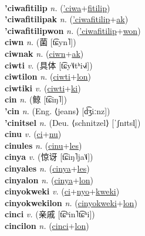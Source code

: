  \label{'ciwa} \\
\textbf{'ciwafitilip} \textit{n.} (\hyperref['ciwa]{'ciwa}+\hyperref[fitilip]{fitilip})
 \label{'ciwafitilip} \\
\textbf{'ciwafitilipak} \textit{n.} (\hyperref['ciwafitilip]{'ciwafitilip}+\hyperref[ak]{ak})
 \label{'ciwafitilipak} \\
\textbf{'ciwafitilipwon} \textit{n.} (\hyperref['ciwafitilip]{'ciwafitilip}+\hyperref[won]{won})
 \label{'ciwafitilipwon} \\
\textbf{ciwn} \textit{n.} ({\chinese{}菌} [t͡ɕyn˥])
 \label{ciwn} \\
\textbf{ciwnak} \textit{n.} (\hyperref[ciwn]{ciwn}+\hyperref[ak]{ak})
 \label{ciwnak} \\
\textbf{ciwti} \textit{v.} ({\chinese{}具体} [t͡ɕy˥˩tʰi˧˩˧])
 \label{ciwti} \\
\textbf{ciwtilon} \textit{n.} (\hyperref[ciwti]{ciwti}+\hyperref[lon]{lon})
 \label{ciwtilon} \\
\textbf{ciwtiki} \textit{v.} (\hyperref[ciwti]{ciwti}+\hyperref[ki]{ki})
 \label{ciwtiki} \\
\textbf{cin} \textit{n.} ({\chinese{}鲸} [t͡ɕiŋ˥])
 \label{cin} \\
\textbf{'cin} \textit{n.} (Eng. ⟨jeans⟩ [d͡ʒiːnz])
 \label{'cin} \\
\textbf{'cinitsel} \textit{n.} (Deu. ⟨schnitzel⟩ [ˈʃnɪtsl̩])
 \label{'cinitsel} \\
\textbf{cinu} \textit{v.} (\hyperref[ci]{ci}+\hyperref[nu]{nu})
 \label{cinu} \\
\textbf{cinules} \textit{n.} (\hyperref[cinu]{cinu}+\hyperref[les]{les})
 \label{cinules} \\
\textbf{cinya} \textit{v.} ({\chinese{}惊讶} [t͡ɕiŋ˥ja˥˩])
 \label{cinya} \\
\textbf{cinyales} \textit{n.} (\hyperref[cinya]{cinya}+\hyperref[les]{les})
 \label{cinyales} \\
\textbf{cinyalon} \textit{n.} (\hyperref[cinya]{cinya}+\hyperref[lon]{lon})
 \label{cinyalon} \\
\textbf{cinyokweki} \textit{v.} (\hyperref[ci]{ci}+\hyperref[nyo]{nyo}+\hyperref[kweki]{kweki})
 \label{cinyokweki} \\
\textbf{cinyokwekilon} \textit{n.} (\hyperref[cinyokweki]{cinyokweki}+\hyperref[lon]{lon})
 \label{cinyokwekilon} \\
\textbf{cinci} \textit{v.} ({\chinese{}亲戚} [t͡ɕʰin˥t͡ɕʰi])
 \label{cinci} \\
\textbf{cincilon} \textit{n.} (\hyperref[cinci]{cinci}+\hyperref[lon]{lon})
